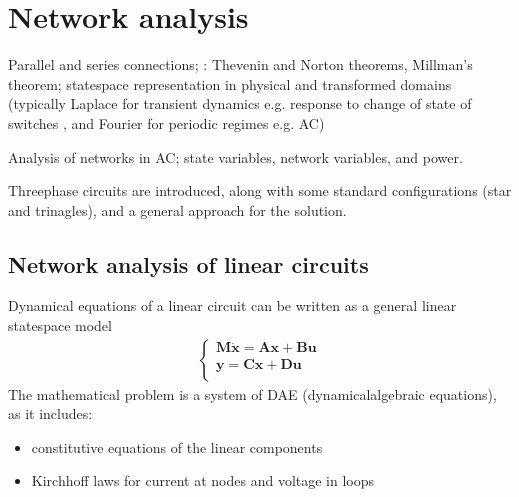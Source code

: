 \documentclass[letterpaper,10pt,english]{jupyterBook}
\begin{document}
\chapter{Network analysis}
\label{\detokenize{ch/electrical-engineering-networks:network-analysis}}\label{\detokenize{ch/electrical-engineering-networks:classical-electromagnetism-electrical-engineering-newtork-analysis}}\label{\detokenize{ch/electrical-engineering-networks::doc}}
\sphinxAtStartPar
{} Parallel and series connections; : Thevenin and Norton theorems, Millman’s theorem; state\sphinxhyphen{}space representation in physical and transformed domains (typically Laplace for transient dynamics \sphinxhyphen{} e.g. response to change of state of switches \sphinxhyphen{}, and Fourier for periodic regimes \sphinxhyphen{} e.g. AC)

\sphinxAtStartPar
{} Analysis of networks in AC; state variables, network variables, and power.

\sphinxAtStartPar
{} Three\sphinxhyphen{}phase circuits are introduced, along with some standard configurations (star and trinagles), and a general approach for the solution.

\sphinxstepscope


\section{Network analysis of linear circuits}
\label{\detokenize{ch/electrical-engineering-networks-linear:network-analysis-of-linear-circuits}}\label{\detokenize{ch/electrical-engineering-networks-linear:classical-electromagnetism-electrical-engineering-newtork-analysis-linear}}\label{\detokenize{ch/electrical-engineering-networks-linear::doc}}
\sphinxAtStartPar
Dynamical equations of a linear circuit can be written as a general linear state\sphinxhyphen{}space model
\begin{equation*}
\begin{split}\begin{cases}
  \mathbf{M} \dot{\mathbf{x}} = \mathbf{A} \mathbf{x} + \mathbf{B} \mathbf{u} \\
  \mathbf{y} = \mathbf{C} \mathbf{x} + \mathbf{D} \mathbf{u} \\
\end{cases}\end{split}
\end{equation*}
\sphinxAtStartPar
The mathematical problem is a system of DAE (dynamical\sphinxhyphen{}algebraic equations), as it includes:
\begin{itemize}
\item {} 
\sphinxAtStartPar
constitutive equations of the linear components

\item {} 
\sphinxAtStartPar
Kirchhoff laws for current at nodes and voltage in loops

\end{itemize}
\end{document}
